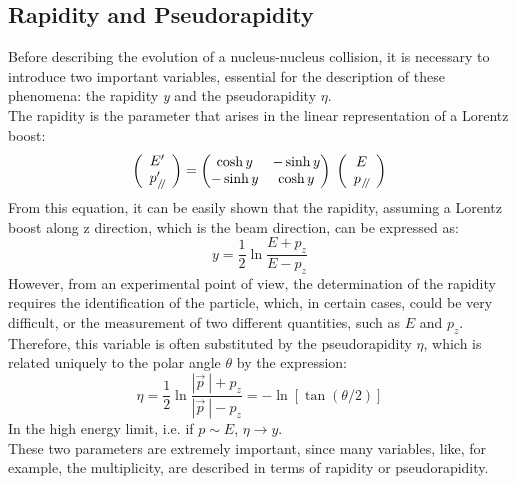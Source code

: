 \subsection{Rapidity and Pseudorapidity}
Before describing the evolution of a nucleus-nucleus collision, it is necessary to introduce two important variables, essential for the description of these phenomena: the rapidity \textit{y} and the pseudorapidity $\eta$.\\
The rapidity is the parameter that arises in the linear representation of a Lorentz boost:
\begin{equation}
 \left(
    \begin{array}{c}
      E'\\
      p'_{\:\mathbin{\!/\mkern-4mu/\!}}
    \end{array}
  \right) = 
      \begin{pmatrix}
      \cosh y & -\sinh y \\
      -\sinh y & \cosh y 
    \end{pmatrix}
  \;
  \left(
     \begin{array}{c}
      E\\
      p_{\:\mathbin{\!/\mkern-4mu/\!}}
    \end{array}
  \right)
\end{equation}
%
From this equation, it can be easily shown that the rapidity, assuming a Lorentz boost along z direction, which is the beam direction, can be expressed as:
\begin{equation}
 y = \frac{1}{2}\ln\frac{E + p_{z}}{E - p_{z}}
\end{equation}
However, from an experimental point of view, the determination of the rapidity requires the identification of the particle, which, in certain cases, could be very difficult, or the measurement of two different quantities, such as $E$ and $p_{z}$. Therefore, this variable is often substituted by the pseudorapidity $\eta$, which is related uniquely to the polar angle $\theta$ by the expression:
\begin{equation}
 \eta = \frac{1}{2}\ln\frac{|\vec{p}\:| + p_{z}}{|\vec{p}\:| - p_{z}} = - \ln [\tan (\theta/2)]
\end{equation}
In the high energy limit, i.e. if $p \sim E$, $\eta \longrightarrow y$.\\
These two parameters are extremely important, since many variables, like, for example, the multiplicity, are described in terms of rapidity or pseudorapidity.
%
